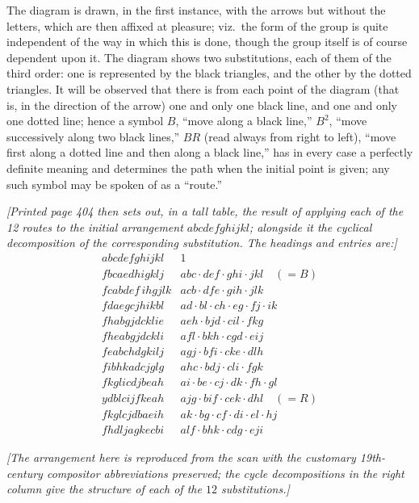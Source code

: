 \documentclass[11pt]{article}
\begin{document}
\medskip

The diagram is drawn, in the first instance, with the arrows but without the letters, which are then affixed at pleasure; viz.\ the form of the group is quite independent of the way in which this is done, though the group itself is of course dependent upon it. The diagram shows two substitutions, each of them of the third order: one is represented by the black triangles, and the other by the dotted triangles. It will be observed that there is from each point of the diagram (that is, in the direction of the arrow) one and only one black line, and one and only one dotted line; hence a symbol $B$, ``move along a black line,'' $B^{2}$, ``move successively along two black lines,'' $BR$ (read always from right to left), ``move first along a dotted line and then along a black line,'' has in every case a perfectly definite meaning and determines the path when the initial point is given; any such symbol may be spoken of as a ``route.''

\medskip

\noindent\textit{[Printed page 404 then sets out, in a tall table, the result of applying each of the 12 routes to the initial arrangement $abcdefghijkl$; alongside it the cyclical decomposition of the corresponding substitution. The headings and entries are:]}
\[
\begin{array}{ll}
abcdefghijkl & 1 \\
fbcaedhi gkl j & abc\cdot def\cdot ghi\cdot jkl \quad(= B) \\
fcabdef\,ihgjlk & acb\cdot dfe\cdot gih\cdot jlk \\
fdaegcjhikbl & ad\cdot bl\cdot ch\cdot eg\cdot fj\cdot ik \\
fhabgjdcklie & aeh\cdot bjd\cdot cil\cdot fkg \\
fheabgjdc kli & afl\cdot bkh\cdot cgd\cdot eij \\
feabchdgkilj & agj\cdot bfi\cdot cke\cdot dlh \\
fibhkadcjglg & ahc\cdot bdj\cdot cli\cdot fgk \\
fkglicdjbeah & ai\cdot be\cdot cj\cdot dk\cdot fh\cdot gl \\
ydblcijfkeah & ajg\cdot bif\cdot cek\cdot dhl \quad(= R) \\
fkglcjdbaeih & ak\cdot bg\cdot cf\cdot di\cdot el\cdot hj \\
fhdljagkecbi & alf\cdot bhk\cdot cdg\cdot eji
\end{array}
\]

\noindent\textit{[The arrangement here is reproduced from the scan with the customary 19th-century compositor abbreviations preserved; the cycle decompositions in the right column give the structure of each of the $12$ substitutions.]}
\end{document}
